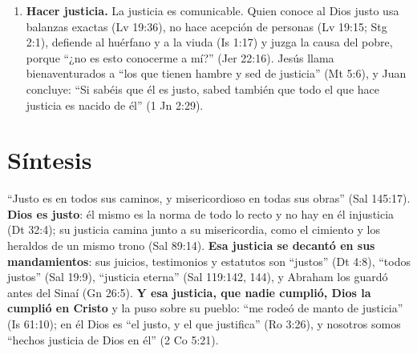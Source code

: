 \begin{enumerate}
\item \textbf{Hacer justicia.} La justicia es comunicable. Quien conoce al Dios justo usa balanzas exactas (Lv 19:36), no hace acepción de personas (Lv 19:15; Stg 2:1), defiende al huérfano y a la viuda (Is 1:17) y juzga la causa del pobre, porque ``¿no es esto conocerme a mí?'' (Jer 22:16). Jesús llama bienaventurados a ``los que tienen hambre y sed de justicia'' (Mt 5:6), y Juan concluye: ``Si sabéis que él es justo, sabed también que todo el que hace justicia es nacido de él'' (1 Jn 2:29).
\end{enumerate}

\section{Síntesis}

``Justo es \SENOR{} en todos sus caminos, y misericordioso en todas sus obras'' (Sal 145:17). \textbf{Dios es justo}: él mismo es la norma de todo lo recto y no hay en él injusticia (Dt 32:4); su justicia camina junto a su misericordia, como el cimiento y los heraldos de un mismo trono (Sal 89:14). \textbf{Esa justicia se decantó en sus mandamientos}: sus juicios, testimonios y estatutos son ``justos'' (Dt 4:8), ``todos justos'' (Sal 19:9), ``justicia eterna'' (Sal 119:142, 144), y Abraham los guardó antes del Sinaí (Gn 26:5). \textbf{Y esa justicia, que nadie cumplió, Dios la cumplió en Cristo} y la puso sobre su pueblo: ``me rodeó de manto de justicia'' (Is 61:10); en él Dios es ``el justo, y el que justifica'' (Ro 3:26), y nosotros somos ``hechos justicia de Dios en él'' (2 Co 5:21).

